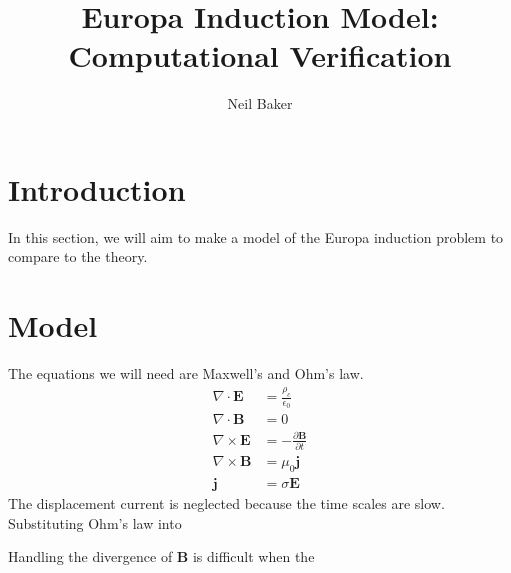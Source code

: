 \documentclass{article}
\title{Europa Induction Model: Computational Verification}
\author{Neil Baker}
\begin{document}
\maketitle

\section{Introduction}
In this section, we will aim to make a model of the Europa induction problem to compare to the theory.

\section{Model}
The equations we will need are Maxwell's and Ohm's law.
\begin{align}
    \nabla\cdot\mathbf{E} &= \frac{\rho_c}{\epsilon_0} \\
    \nabla\cdot \mathbf{B} &= 0 \\
    \nabla\times\mathbf{E} &= -\frac{\partial\mathbf{B}}{\partial t} \\
    \nabla\times\mathbf{B} &= \mu_0\mathbf{j} \\
    \mathbf{j} &= \sigma\mathbf{E}
\end{align}
The displacement current is neglected because the time scales are slow. Substituting Ohm's law into 

Handling the divergence of $\mathbf{B}$ is difficult when the 
\end{document}

